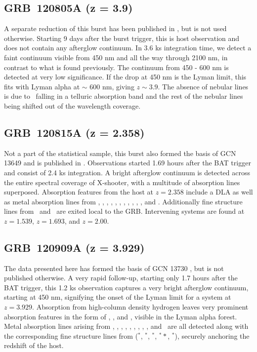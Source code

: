 \documentclass{aa}    %
\begin{document}
\subsection{GRB~120805A (z = 3.9)} \label{120805}

A separate reduction of this burst has been published in \citet{Kruhler2015},
but is not used otherwise. Starting 9 days after the burst trigger, this is host
observation and does not contain any afterglow continuum. In 3.6 ks integration
time, we detect a faint continuum visible from 450 nm and all the way through
2100 nm, in contrast to what is found previously. The continuum from 450 - 600
nm is detected at very low significance. If the drop at 450 nm is the Lyman
limit, this fits with Lyman alpha at $\sim$ 600 nm, giving $z \sim 3.9$. The
absence of nebular lines is due to \oii~falling in a telluric absorption band
and the rest of the nebular lines being shifted out of the wavelength coverage.

\subsection{GRB~120815A (z = 2.358)} \label{120815}

Not a part of the statistical sample, this burst also formed the basis of  GCN
13649 \citep{GCN13649} and is published in \citet{Kruhler2013}. Observations
started 1.69 hours after the BAT trigger and consist of 2.4 ks integration. A
bright afterglow continuum is detected across the entire spectral coverage of
X-shooter, with a multitude of absorption lines superposed. Absorption features
from the host at $z = 2.358$ include a DLA as well as metal absorption lines
from \nv, \sii, \SIii, \oi, \civ, \SIiv, \feii, \alii, \aliii, \mnii, \mgii, and
\mgi. Additionally fine structure lines from \NIii~and \feii~are exited local to
the GRB. Intervening systems are found at $z = 1.539$, $z = 1.693$, and $z =
2.00$.

\subsection{GRB~120909A (z = 3.929)} \label{120909}

The data presented here has formed the basis of GCN 13730 \citep{GCN13730}, but
is not published otherwise. A very rapid follow-up, starting only 1.7 hours
after the BAT trigger, this 1.2 ks observation captures a very bright afterglow
continuum, starting at 450 nm, signifying the onset of the Lyman limit for a
system at $z = 3.929$. Absorption from high-column density hydrogen leaves very
prominent absorption features in the form of \lya, \lyb, and \lyg, visible in
the Lyman alpha forest. Metal absorption lines arising from \feii, \NIii, \SIii,
\sii, \alii, \aliii, \cii, \oi, \civ, and \znii~are all detected along with the
corresponding fine structure lines from (\feii$^*$, \SIii$^*$, \oi$^*$,
\oi$^**$, \cii$^*$), securely anchoring the redshift of the host.
\end{document}
